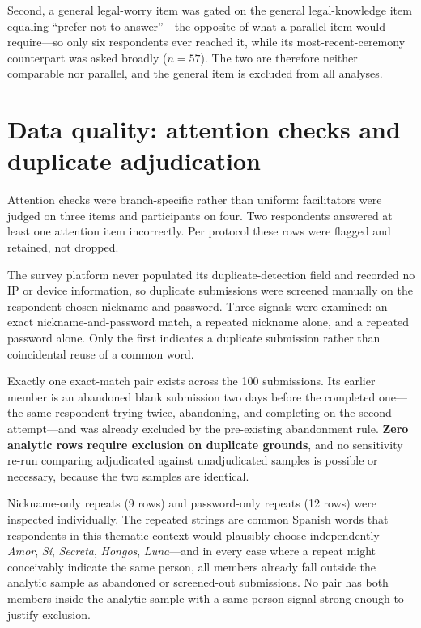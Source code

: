 \documentclass[12pt]{article}
\begin{document}
Second, a general legal-worry item was gated on the general legal-knowledge item equaling ``prefer not to
answer''---the opposite of what a parallel item would require---so only six respondents ever reached it,
while its most-recent-ceremony counterpart was asked broadly ($n=57$). The two are therefore neither
comparable nor parallel, and the general item is excluded from all analyses.

\section{Data quality: attention checks and duplicate adjudication}

Attention checks were branch-specific rather than uniform: facilitators were judged on three items and
participants on four. Two respondents answered at least one attention item incorrectly. Per protocol these
rows were flagged and retained, not dropped.

The survey platform never populated its duplicate-detection field and recorded no IP or device information,
so duplicate submissions were screened manually on the respondent-chosen nickname and password. Three
signals were examined: an exact nickname-and-password match, a repeated nickname alone, and a repeated
password alone. Only the first indicates a duplicate submission rather than coincidental reuse of a common
word.

Exactly one exact-match pair exists across the 100 submissions. Its earlier member is an abandoned blank
submission two days before the completed one---the same respondent trying twice, abandoning, and
completing on the second attempt---and was already excluded by the pre-existing abandonment rule.
\textbf{Zero analytic rows require exclusion on duplicate grounds}, and no sensitivity re-run comparing
adjudicated against unadjudicated samples is possible or necessary, because the two samples are identical.

Nickname-only repeats (9 rows) and password-only repeats (12 rows) were inspected individually. The
repeated strings are common Spanish words that respondents in this thematic context would plausibly choose
independently---\emph{Amor}, \emph{S\'i}, \emph{Secreta}, \emph{Hongos}, \emph{Luna}---and in every case
where a repeat might conceivably indicate the same person, all members already fall outside the analytic
sample as abandoned or screened-out submissions. No pair has both members inside the analytic sample with a
same-person signal strong enough to justify exclusion.
\end{document}
